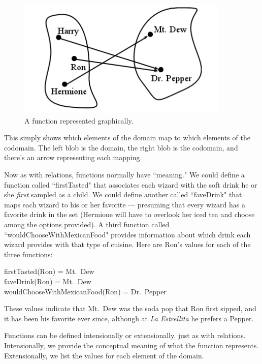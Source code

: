 \begin{figure}[ht]
\centering
\includegraphics[width=0.9\textwidth]{function.png}
\caption{A function represented graphically.}
\label{function}
\end{figure}

This simply shows which elements of the domain map to which elements of the
codomain. The left blob is the domain, the right blob is the codomain, and
there's an arrow representing each mapping.

Now as with relations, functions normally have ``meaning." We could define
a function called ``firstTasted" that associates each wizard with the soft
drink he or she \textit{first} sampled as a child. We could define another
called ``faveDrink" that maps each wizard to his or her favorite ---
presuming that every wizard has a favorite drink in the set (Hermione will
have to overlook her iced tea and choose among the options provided).  A
third function called ``wouldChooseWithMexicanFood" provides information
about which drink each wizard provides with that type of cuisine. Here are
Ron's values for each of the three functions:

\begin{center}
firstTasted(Ron) = Mt.~Dew \\
faveDrink(Ron) = Mt.~Dew \\
wouldChooseWithMexicanFood(Ron) = Dr.~Pepper
\end{center}

These values indicate that Mt.~Dew was the soda pop that Ron first sipped,
and it has been his favorite ever since, although at \textit{La Estrellita}
he prefers a Pepper.

Functions can be defined intensionally or extensionally, just as with
relations. Intensionally, we provide the conceptual meaning of what the
function represents. Extensionally, we list the values for each element of
the domain.

